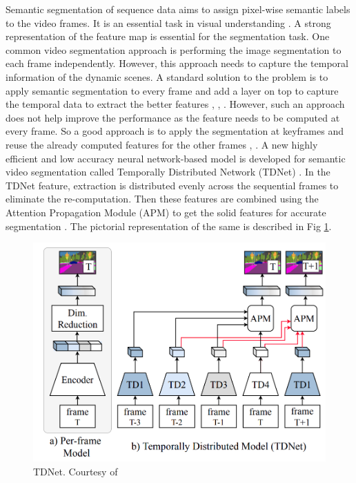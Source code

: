 	Semantic segmentation of sequence data aims to assign pixel-wise semantic labels to the video frames. It is an essential task in visual understanding \cite{72_jin2017video}. A strong representation of the feature map is essential for the segmentation task. One common video segmentation approach is performing the image segmentation to each frame independently. However, this approach needs to capture the temporal information of the dynamic scenes. A standard solution to the problem is to apply semantic segmentation to every frame and add a layer on top to capture the temporal data to extract the better features \cite{73_gadde2017semantic}, \cite{74_jin2017video}, \cite{75_nilsson2018semantic}. However, such an approach does not help improve the performance as the feature needs to be computed at every frame. So a good approach is to apply the segmentation at keyframes and reuse the already computed features for the other frames \cite{76_jain2019accel}, \cite{77_mahasseni2017budget}. A new highly efficient and low accuracy neural network-based model is developed for semantic video segmentation called Temporally Distributed Network (TDNet) \cite{78_hu2020temporally}. In the TDNet feature, extraction is distributed evenly across the sequential frames to eliminate the re-computation. Then these features are combined using the Attention Propagation Module (APM) to get the solid features for accurate segmentation \cite{78_hu2020temporally}. The pictorial representation of the same is described in Fig \ref{fig:TDNet}. 
    
    \begin{figure}[h]
    	\centering
    	\includegraphics[width=12cm]{images/TDNet.png}
    	\caption{TDNet. Courtesy of \cite{78_hu2020temporally}}
    	\label{fig:TDNet}
    \end{figure}  
    
